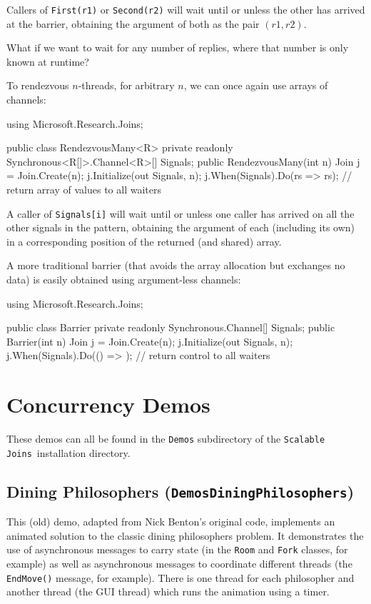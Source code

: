 \documentclass{article}
\newcommand{\demo}[1]{\texorpdfstring{{(\texttt{Demos{\symbol{92}}#1})}}{}}
\newcommand{\sjoins}{{\texttt{Scalable Joins}}}
\begin{document}
Callers of \texttt{First(r1)} or \texttt{Second(r2)} will wait until or unless the other has arrived at the barrier, obtaining the argument of both as the
pair $(r1,r2)$.

What if we want to wait for  any number of replies, where that number is only known at runtime?

To rendezvous $n$-threads, for arbitrary $n$, we can once again use arrays of channels:

\begin{lstcsharp}
using Microsoft.Research.Joins;

public class RendezvousMany<R> {
  private readonly Synchronous<R[]>.Channel<R>[] Signals;
  public RendezvousMany(int n) {
    Join j = Join.Create(n);
    j.Initialize(out Signals, n);
    j.When(Signals).Do(rs => rs); // return array of values to all waiters
  }
}
\end{lstcsharp}

A caller of \texttt{Signals[i]} will wait until or unless one caller has arrived on all the other signals in the pattern, 
obtaining the argument of each (including its own) in a corresponding position of the returned (and shared) array.

A more traditional barrier (that avoids the array allocation but exchanges no data) is easily obtained using argument-less channels:

\begin{lstcsharp}
using Microsoft.Research.Joins;

public class Barrier {
  private readonly Synchronous.Channel[] Signals;
  public Barrier(int n) {
    Join j = Join.Create(n);
    j.Initialize(out Signals, n);
    j.When(Signals).Do(() => {}); // return control to all waiters
  }
}
\end{lstcsharp}


\section{Concurrency Demos}\label{demos}

These demos can all be found in the \texttt{Demos} subdirectory of the
\sjoins\ installation directory.

\subsection{Dining Philosophers \demo{DiningPhilosophers}}
This (old) demo, adapted from Nick Benton's original code, implements an animated solution to the
classic dining philosophers problem. It demonstrates the use of
asynchronous messages to carry state (in the \texttt{Room} and
\texttt{Fork} classes, for example) as well as asynchronous messages
to coordinate different threads (the \texttt{EndMove()} message, for
example). There is one thread for each philosopher and another thread
(the GUI thread) which runs the animation using a timer.
\end{document}
